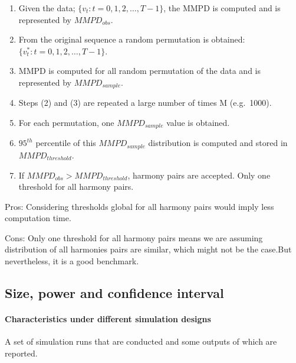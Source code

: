 \documentclass[
]{article}
\begin{document}
\begin{enumerate}
\def\labelenumi{\arabic{enumi}.}
\item
  Given the data; \(\{v_t: t=0, 1, 2, \dots, T-1\}\), the MMPD is computed and is represented by \(MMPD_{obs}\).
\item
  From the original sequence a random permutation is obtained: \(\{v_t^*: t=0, 1, 2, \dots, T-1\}\).
\item
  MMPD is computed for all random permutation of the data and is represented by \(MMPD_{sample}\).
\item
  Steps (2) and (3) are repeated a large number
  of times M (e.g.~1000).
\item
  For each permutation, one \(MMPD_{sample}\) value is obtained.
\item
  \(95^{th}\) percentile of this \(MMPD_{sample}\) distribution is computed and stored in \(MMPD_{threshold}\).
\item
  If \(MMPD_{obs}> MMPD_{threshold}\), harmony pairs are accepted. Only one threshold for all harmony pairs.
\end{enumerate}

Pros: Considering thresholds global for all harmony pairs would imply less computation time.

Cons: Only one threshold for all harmony pairs means we are assuming distribution of all harmonies pairs are similar, which might not be the case.But nevertheless, it is a good benchmark.

\hypertarget{size-power-and-confidence-interval}{%
\subsection{Size, power and confidence interval}\label{size-power-and-confidence-interval}}

\hypertarget{characteristics-under-different-simulation-designs}{%
\paragraph{Characteristics under different simulation designs}\label{characteristics-under-different-simulation-designs}}

A set of simulation runs that are conducted and some outputs of which are reported.
\end{document}
